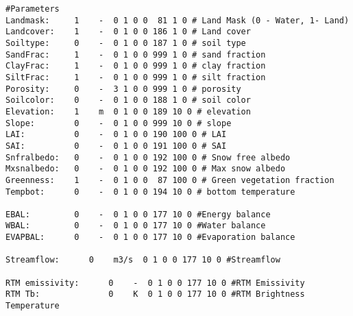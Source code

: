 \begin{verbatim}
#Parameters 
Landmask:     1    -  0 1 0 0  81 1 0 # Land Mask (0 - Water, 1- Land)
Landcover:    1    -  0 1 0 0 186 1 0 # Land cover
Soiltype:     0    -  0 1 0 0 187 1 0 # soil type
SandFrac:     1    -  0 1 0 0 999 1 0 # sand fraction
ClayFrac:     1    -  0 1 0 0 999 1 0 # clay fraction
SiltFrac:     1    -  0 1 0 0 999 1 0 # silt fraction
Porosity:     0    -  3 1 0 0 999 1 0 # porosity
Soilcolor:    0    -  0 1 0 0 188 1 0 # soil color
Elevation:    1    m  0 1 0 0 189 10 0 # elevation
Slope:        0    -  0 1 0 0 999 10 0 # slope
LAI:          0    -  0 1 0 0 190 100 0 # LAI
SAI:          0    -  0 1 0 0 191 100 0 # SAI
Snfralbedo:   0    -  0 1 0 0 192 100 0 # Snow free albedo
Mxsnalbedo:   0    -  0 1 0 0 192 100 0 # Max snow albedo
Greenness:    1    -  0 1 0 0  87 100 0 # Green vegetation fraction
Tempbot:      0    -  0 1 0 0 194 10 0 # bottom temperature

EBAL:         0    -  0 1 0 0 177 10 0 #Energy balance
WBAL:         0    -  0 1 0 0 177 10 0 #Water balance
EVAPBAL:      0    -  0 1 0 0 177 10 0 #Evaporation balance

Streamflow:      0    m3/s  0 1 0 0 177 10 0 #Streamflow 

RTM emissivity:      0    -  0 1 0 0 177 10 0 #RTM Emissivity
RTM Tb:              0    K  0 1 0 0 177 10 0 #RTM Brightness Temperature

 \end{verbatim}
